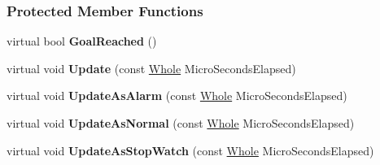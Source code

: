 \subsubsection*{Protected Member Functions}
\begin{DoxyCompactItemize}
\item 
\hypertarget{classMezzanine_1_1SimpleTimer_a54808aa29afab73aa5cbc397a8ac18b1}{
virtual bool {\bfseries GoalReached} ()}
\label{classMezzanine_1_1SimpleTimer_a54808aa29afab73aa5cbc397a8ac18b1}

\item 
\hypertarget{classMezzanine_1_1SimpleTimer_a382e30e3e07b0db87cddfedcc13706e8}{
virtual void {\bfseries Update} (const \hyperlink{namespaceMezzanine_adcbb6ce6d1eb4379d109e51171e2e493}{Whole} MicroSecondsElapsed)}
\label{classMezzanine_1_1SimpleTimer_a382e30e3e07b0db87cddfedcc13706e8}

\item 
\hypertarget{classMezzanine_1_1SimpleTimer_a6dc58340f18e0966496a57c956aeb855}{
virtual void {\bfseries UpdateAsAlarm} (const \hyperlink{namespaceMezzanine_adcbb6ce6d1eb4379d109e51171e2e493}{Whole} MicroSecondsElapsed)}
\label{classMezzanine_1_1SimpleTimer_a6dc58340f18e0966496a57c956aeb855}

\item 
\hypertarget{classMezzanine_1_1SimpleTimer_a0f16ab0c11ea35b38eb73188d4ace9b4}{
virtual void {\bfseries UpdateAsNormal} (const \hyperlink{namespaceMezzanine_adcbb6ce6d1eb4379d109e51171e2e493}{Whole} MicroSecondsElapsed)}
\label{classMezzanine_1_1SimpleTimer_a0f16ab0c11ea35b38eb73188d4ace9b4}

\item 
\hypertarget{classMezzanine_1_1SimpleTimer_a4b371f7d07acddf9c42964fcf065f4ad}{
virtual void {\bfseries UpdateAsStopWatch} (const \hyperlink{namespaceMezzanine_adcbb6ce6d1eb4379d109e51171e2e493}{Whole} MicroSecondsElapsed)}
\label{classMezzanine_1_1SimpleTimer_a4b371f7d07acddf9c42964fcf065f4ad}

\end{DoxyCompactItemize}
